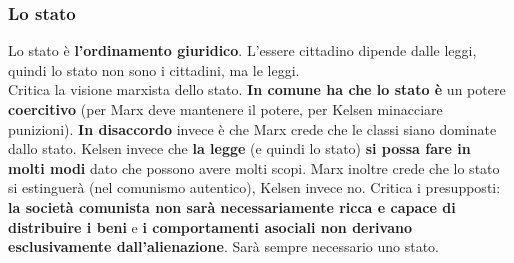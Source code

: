 \subsubsection{Lo stato}
Lo stato è \textbf{l'ordinamento giuridico}. L'essere cittadino dipende dalle leggi, quindi lo stato
non sono i cittadini, ma le leggi.\\
Critica la visione marxista dello stato. \textbf{In comune ha che lo stato è} un potere 
\textbf{coercitivo} (per Marx deve mantenere il potere, per Kelsen minacciare punizioni). 
\textbf{In disaccordo} invece è che Marx crede che le classi siano dominate dallo stato. Kelsen 
invece che \textbf{la legge} (e quindi lo stato) \textbf{si possa fare in molti modi} dato che 
possono avere molti scopi. Marx inoltre crede che lo stato si estinguerà (nel comunismo autentico), 
Kelsen invece no. Critica i presupposti: \textbf{la società comunista non sarà necessariamente ricca 
e capace di distribuire i beni} e \textbf{i comportamenti asociali non derivano esclusivamente 
dall'alienazione}. Sarà sempre necessario uno stato.

